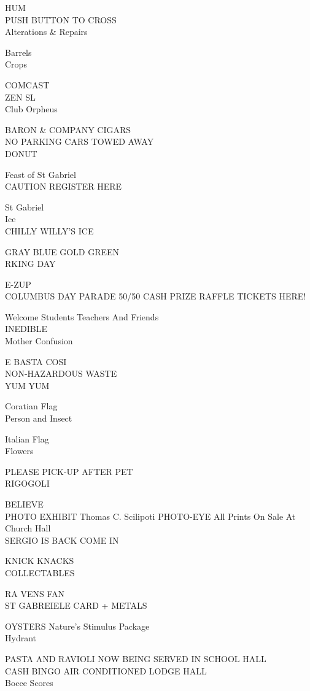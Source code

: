 \documentclass[10pt,letterpaper]{article}
\begin{document}
HUM\\
PUSH BUTTON TO CROSS\\
Alterations \& Repairs

Barrels\\
Crops

COMCAST\\
ZEN SL\\
Club Orpheus

BARON \& COMPANY CIGARS\\
NO PARKING CARS TOWED AWAY\\
DONUT

Feast of St Gabriel\\
CAUTION REGISTER HERE

St Gabriel\\
Ice\\
CHILLY WILLY'S ICE

GRAY BLUE GOLD GREEN\\
RKING DAY

E{-}ZUP\\
COLUMBUS DAY PARADE 50/50 CASH PRIZE RAFFLE TICKETS HERE!

Welcome Students Teachers And Friends\\
INEDIBLE\\
Mother Confusion

E BASTA COSI\\
NON{-}HAZARDOUS WASTE\\
YUM YUM

Coratian Flag\\
Person and Insect

Italian Flag\\
Flowers

PLEASE PICK{-}UP AFTER PET\\
RIGOGOLI

BELIEVE\\
PHOTO EXHIBIT Thomas C. Scilipoti PHOTO{-}EYE All Prints On Sale At Church Hall\\
SERGIO IS BACK COME IN

KNICK KNACKS\\
COLLECTABLES

RA VENS FAN\\
ST GABREIELE CARD + METALS

OYSTERS Nature's Stimulus Package\\
Hydrant

PASTA AND RAVIOLI NOW BEING SERVED IN SCHOOL HALL\\
CASH BINGO AIR CONDITIONED LODGE HALL\\
Bocce Scores
\end{document}
